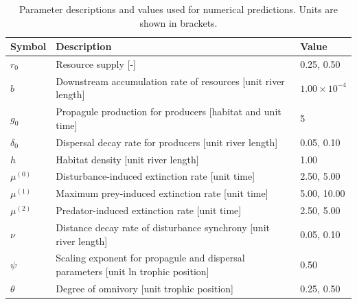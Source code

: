 \begin{table}[ht]
\centering
\caption{Parameter descriptions and values used for numerical predictions. Units are shown in brackets.} 
\label{tab:parms-num}
\begingroup\small
\begin{tabularx}{\textwidth}{lll}
  \hline
Symbol & Description & Value \\ 
  \hline
$r_0$ & Resource supply [-] & 0.25, 0.50 \\ 
  $b$ & Downstream accumulation rate of resources [unit river length] & $1.00 \times 10^{-4}$ \\ 
  $g_0$ & Propagule production for producers [habitat and unit time] & 5 \\ 
  $\delta_0$ & Dispersal decay rate for producers [unit river length] & 0.05, 0.10 \\ 
  $h$ & Habitat density [unit river length] & 1.00 \\ 
  $\mu^{(0)}$ & Disturbance-induced extinction rate [unit time] & 2.50, 5.00 \\ 
  $\mu^{(1)}$ & Maximum prey-induced extinction rate [unit time] & 5.00, 10.00 \\ 
  $\mu^{(2)}$ & Predator-induced extinction rate [unit time] & 2.50, 5.00 \\ 
  $\nu$ & Distance decay rate of disturbance synchrony [unit river length] & 0.05, 0.10 \\ 
  $\psi$ & Scaling exponent for propagule and dispersal parameters [unit ln trophic position] & 0.50 \\ 
  $\theta$ & Degree of omnivory [unit trophic position] & 0.25, 0.50 \\ 
   \hline
\end{tabularx}
\endgroup
\end{table}
